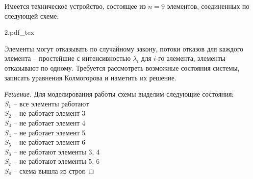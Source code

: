 \documentclass[12pt,a4paper]{article}
\author{Самутичев Е.Р.}
\date{\today}
\title{}
\newcommand{\incfig}[1]{%
	\def\svgwidth{\columnwidth}
	{#1.pdf_tex}
}
\begin{document}
	
\maketitle

\begin{exercise}[Задача 4-4]
	Имеется техническое устройство, состоящее из $n = 9$ элементов, соединенных по следующей схеме:
	
	\incfig{2}
	
	Элементы могут отказывать по случайному закону, потоки отказов для каждого элемента -- простейшие с интенсивностью $\lambda_i$ для $i$-го элемента, элементы отказывают по одному. Требуется рассмотреть возможные состояния системы, записать уравнения Колмогорова и наметить их решение.
\end{exercise}
\begin{proof}[Решение]
	Для моделирования работы схемы выделим следующие состояния: \\
	$S_1$ -- все элементы работают \\
	$S_2$ -- не работает элемент 3 \\
	$S_3$ -- не работает элемент 4 \\
	$S_4$ -- не работает элемент 5 \\
	$S_5$ -- не работает элемент 6 \\
	$S_6$ -- не работают элементы 3, 4 \\
	$S_7$ -- не работают элементы 5, 6 \\
	$S_8$ -- схема вышла из строя
	

\end{proof}
\end{document}
